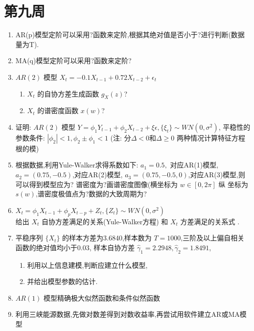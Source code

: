 \section{第九周}
\begin{enumerate}
    \item AR(p)模型定阶可以采用?函数来定阶,根据其绝对值是否小于?进行判断(数据量为T).
    
    \item MA(q)模型定阶可以采用?函数来定阶?
    
    \item $AR(2)$ 模型 $X_{t}=-0.1X_{t-1}+0.72X_{t-2}+\epsilon_{t}$
    \begin{enumerate}
        \item $X_{t}$ 的自协方差生成函数 $g_{X}(z)$?
        \item $X_{t}$ 的谱密度函数 $x(w)$?
    \end{enumerate}
    
    \item 证明: $AR(2)$ 模型 $Y = \phi_{1}Y_{t-1} +\phi_{2}X_{t-2} +\xi \epsilon, \{\xi_{t}\}\sim WN(0,\sigma^{2})$,
    平稳性的参数条件: $|\phi_{2}|<1,\phi_{2}\pm\phi_{1}<1$ (注: 分$\Delta<0\text{和}\Delta\ge0$ 两种情况计算特征方程根的模)

    \item 根据数据,利用Yule-Walker求得系数如下: $a_{1}=0.5,$ 对应AR(1)模型, $a_{2}=(0.75,-0.5)$,对应AR(2)模型, $a_{3}=(0.75,-0.5,0)$,对应AR(3)模型,则可以得到模型应为?
    谱密度为?画谱密度图像(横坐标为 $w\in[0,2\pi]$ 纵 坐标为 $s(w)$,谱密度极值点为?数据的大致周期为?

    \item $X_{t}=\phi_{1}X_{t-1}+\phi_{p}X_{t-p}+Z_{t},\{Z_{t}\}\sim WN(0,\sigma^{2})$
    \\ 给出 $X_{t}$ 自协方差满足的关系(Yule-Walker方程) 和 $X_{t}$ 方差满足的关系式
    .

    \item 平稳序列 $\{X_{t}\}$ 的样本方差为3.6840,样本数为 $T=1000$,三阶及以上偏自相关函数的绝对值均小于0.03,
    样本自协方差 $\hat{\gamma}_{1}=2.2948 ,\hat{\gamma}_{2} = 1.8491$,
    \begin{enumerate}
        \item 利用以上信息建模,判断应建立什么模型,
        \item 并给出模型参数的估计.
    \end{enumerate}

    \item $AR(1)$ 模型精确极大似然函数和条件似然函数

    \item 利用三峡能源数据,先做对数差得到对数收益率,再尝试用软件建立AR或MA模型

\end{enumerate}


